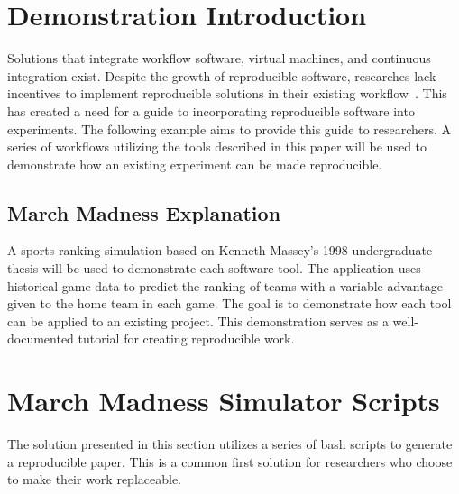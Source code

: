 \documentclass{IEEEtran}
\begin{document}
\section{Demonstration Introduction }
Solutions that integrate workflow software, virtual machines, and continuous integration exist. Despite the growth of reproducible software, researches lack incentives to implement reproducible solutions in their existing workflow~\cite{ITD}. This has created a need for a guide to incorporating reproducible software into experiments. The following example aims to provide this guide to researchers. A series of workflows utilizing the tools described in this paper will be used to demonstrate how an existing experiment can be made reproducible.

\subsection{March Madness Explanation}
A sports ranking simulation based on Kenneth Massey’s 1998 undergraduate thesis will be used to demonstrate each software tool. 
The application uses historical game data to predict the ranking of teams with a variable advantage given to the home team in each game. The goal is to demonstrate how each tool can be applied to an existing project. This demonstration serves as a well-documented tutorial for creating reproducible work.

\section{March Madness Simulator Scripts}

The solution presented in this section utilizes a series of bash scripts to generate a reproducible paper. This is a common first solution for researchers who choose to make their work replaceable. 
\end{document}
